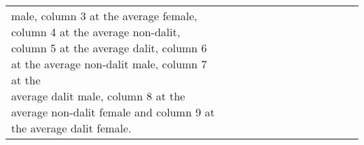 \begin{table}[!h]
{\begin{tabular}{lcccccccccccc}
{	male, column 3 at the average female, column 4 at the average non-dalit, column 5 at the average dalit, column 6 at the average non-dalit male, column 7 at the \\ 
	average dalit male, column 8 at the average non-dalit female and column 9 at the average dalit female.} \\
    \end{tabular}%
	}
  \label{tab:ame_fe_loanamount}%
\end{table}%

